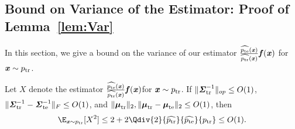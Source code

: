 \subsection*{Bound on Variance of the Estimator: Proof of Lemma~\ref{lem:Var}}
In this section, we give a bound on the variance of our estimator $ \frac{\widehat{\pte}(\xx)}{\widehat{\ptr}(\xx)}\ff(\xx)$ for $\xx \sim \ptr$.

\begin{lemma}\label{lem:BoundSquaredVariance}
Let $X$ denote the estimator $\frac{\widehat{\pte}(\xx)}{\widehat{\ptr}(\xx)}\ff(\xx)$for $\xx \sim \ptr$. If $\|\str^{-1}\|_{op}\leq O(1)$, $\|\str^{-1}-\ste^{-1}\|_F\leq O(1)$, and $\|\mtr\|_2, \|\mtr-\mte\|_2\leq O(1)$, then
\begin{equation*}
    \E_{\xx \sim \ptr}[X^2] \leq 2 + 2\Qdiv{2}{\widehat{\ptr}}{\widehat{\pte}}{\ptr} \leq O(1).
\end{equation*}
\end{lemma}
